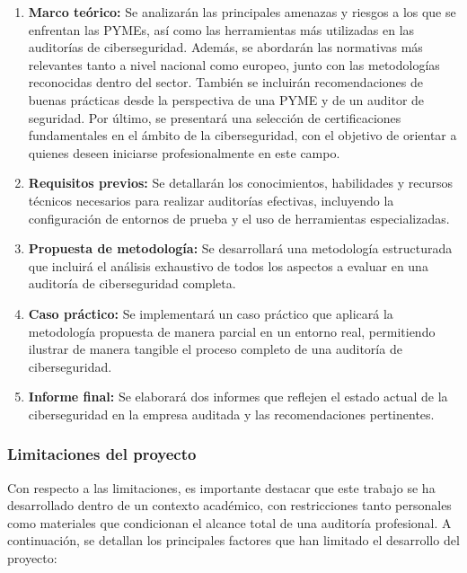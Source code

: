 \documentclass[a4paper, 11pt]{article}
\begin{document}
\begin{enumerate}
    \item \textbf{Marco teórico:} Se analizarán las principales amenazas y riesgos a los que se enfrentan las PYMEs, así como las herramientas más utilizadas en las auditorías de ciberseguridad. Además, se abordarán las normativas más relevantes tanto a nivel nacional como europeo, junto con las metodologías reconocidas dentro del sector. También se incluirán recomendaciones de buenas prácticas desde la perspectiva de una PYME y de un auditor de seguridad. Por último, se presentará una selección de certificaciones fundamentales en el ámbito de la ciberseguridad, con el objetivo de orientar a quienes deseen iniciarse profesionalmente en este campo.    
    
    \item \textbf{Requisitos previos:} Se detallarán los conocimientos, habilidades y recursos técnicos necesarios para realizar auditorías efectivas, incluyendo la configuración de entornos de prueba y el uso de herramientas especializadas.
        
    \item \textbf{Propuesta de metodología:} Se desarrollará una metodología estructurada que incluirá el análisis exhaustivo de todos los aspectos a evaluar en una auditoría de ciberseguridad completa.
    \item \textbf{Caso práctico:} Se implementará un caso práctico que aplicará la metodología propuesta de manera parcial en un entorno real, permitiendo ilustrar de manera tangible el proceso completo de una auditoría de ciberseguridad.
    
    \item \textbf{Informe final:} Se elaborará dos informes que reflejen el estado actual de la ciberseguridad en la empresa auditada y las recomendaciones pertinentes.
\end{enumerate}

\subsubsection*{Limitaciones del proyecto}


Con respecto a las limitaciones, es importante destacar que este trabajo se ha desarrollado dentro de un contexto académico, con restricciones tanto personales como materiales que condicionan el alcance total de una auditoría profesional. A continuación, se detallan los principales factores que han limitado el desarrollo del proyecto:
\end{document}
